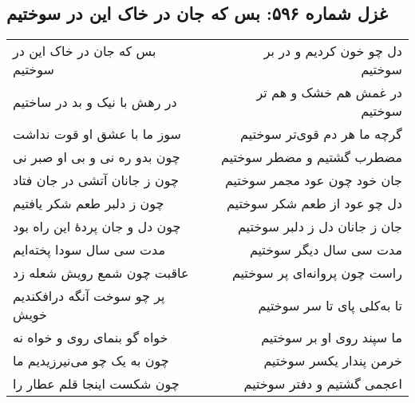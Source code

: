 \begin{center}
\section*{غزل شماره ۵۹۶: بس که جان در خاک این در سوختیم}
\label{sec:596}
\begin{longtable}{l p{0.5cm} r}
بس که جان در خاک این در سوختیم
&&
دل چو خون کردیم و در بر سوختیم
\\
در رهش با نیک و بد در ساختیم
&&
در غمش هم خشک و هم تر سوختیم
\\
سوز ما با عشق او قوت نداشت
&&
گرچه ما هر دم قوی‌تر سوختیم
\\
چون بدو ره نی و بی او صبر نی
&&
مضطرب گشتیم و مضطر سوختیم
\\
چون ز جانان آتشی در جان فتاد
&&
جان خود چون عود مجمر سوختیم
\\
چون ز دلبر طعم شکر یافتیم
&&
دل چو عود از طعم شکر سوختیم
\\
چون دل و جان پردهٔ این راه بود
&&
جان ز جانان دل ز دلبر سوختیم
\\
مدت سی سال سودا پخته‌ایم
&&
مدت سی سال دیگر سوختیم
\\
عاقبت چون شمع رویش شعله زد
&&
راست چون پروانه‌ای پر سوختیم
\\
پر چو سوخت آنگه درافکندیم خویش
&&
تا به‌کلی پای تا سر سوختیم
\\
خواه گو بنمای روی و خواه نه
&&
ما سپند روی او بر سوختیم
\\
چون به یک چو می‌نیرزیدیم ما
&&
خرمن پندار یکسر سوختیم
\\
چون شکست اینجا قلم عطار را
&&
اعجمی گشتیم و دفتر سوختیم
\\
\end{longtable}
\end{center}
